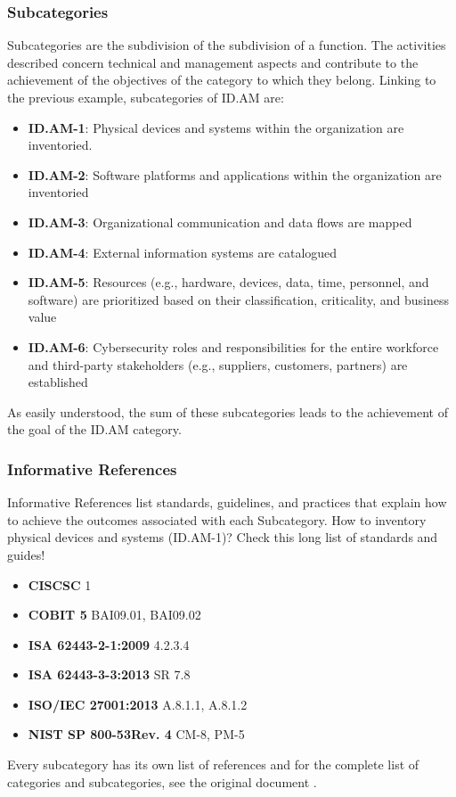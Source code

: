 \subsubsection{Subcategories}
Subcategories are the subdivision of the subdivision of a function. The activities described concern technical and management aspects and contribute to the achievement of the objectives of the category to which they belong.
Linking to the previous example, subcategories of ID.AM are:
\begin{itemize}
\itemsep0em
    \item \textbf{ID.AM-1}: Physical devices and systems within the organization are inventoried.
    \item \textbf{ID.AM-2}: Software platforms and applications within the organization are inventoried
    \item \textbf{ID.AM-3}: Organizational communication and data flows are mapped
    \item \textbf{ID.AM-4}: External information systems are catalogued
    \item \textbf{ID.AM-5}: Resources (e.g., hardware, devices, data, time, personnel, and software) are prioritized based on their classification, criticality, and business value
    \item \textbf{ID.AM-6}: Cybersecurity roles and responsibilities for the entire workforce and third-party stakeholders (e.g., suppliers, customers, partners) are established
\end{itemize}
As easily understood, the sum of these subcategories leads to the achievement of the goal of the ID.AM category.
\subsubsection{Informative References}
Informative References list standards, guidelines, and practices that explain how to achieve the outcomes associated with each Subcategory. How to inventory physical devices and systems (ID.AM-1)? Check this long list of standards and guides!
\begin{itemize}
\itemsep0em
    \item \textbf{CISCSC} 1
    \item \textbf{COBIT 5} BAI09.01, BAI09.02
    \item \textbf{ISA 62443-2-1:2009} 4.2.3.4
    \item \textbf{ISA 62443-3-3:2013} SR 7.8
    \item \textbf{ISO/IEC 27001:2013} A.8.1.1, A.8.1.2
    \item \textbf{NIST SP 800-53Rev. 4} CM-8, PM-5
\end{itemize}
Every subcategory has its own list of references and for the complete list of categories and subcategories, see the original document \cite{NIST2018}.
